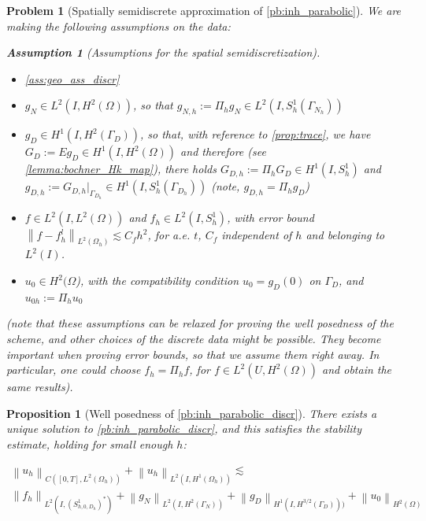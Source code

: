 \documentclass[english,a4paper,9pt,oneside]{scrbook}	%
\theoremstyle{break}
\newtheorem{prop}[equation]{Proposition}
\newtheorem{ass}[equation]{Assumption}
\newtheorem{pb}[equation]{Problem}
\theoremstyle{remark}
\newcommand{\norm}[1]{\left\lVert#1\right\rVert}
\begin{document}
\begin{appendices}
\begin{pb}[Spatially semidiscrete approximation of \cref{pb:inh_parabolic}]
We are making the following assumptions on the data:

\begin{ass}[Assumptions for the spatial semidiscretization]
\label{ass:discr_reg}
\textcolor{white}{ }
\begin{itemize}
	\item \cref{ass:geo_ass_discr}
	\item $g_N \in L^2(I,H^2(\Omega))$, so that $g_{N,h}:=\Pi_h g_N \in L^2(I, S^1_h(\Gamma_{N_h}))$
	\item $g_D \in H^1(I, H^{2}(\Gamma_D))$, so that, with reference to \cref{prop:trace}, we have $G_D:=Eg_D \in H^1(I,H^2(\Omega))$ and therefore (see \cref{lemma:bochner_Hk_map}), there holds	 $G_{D,h}:=\Pi_h G_D \in H^1(I, S^1_h)$ and $g_{D,h}:=G_{D,h}|_{\Gamma_{D_h}} \in H^1(I, S^1_h(\Gamma_{D_h}))$ (note, $g_{D,h} = \Pi_h g_D$)
	\item $f \in L^2(I,L^2(\Omega))$ and $f_h \in L^2(I, S^1_h)$, with error bound  $\norm{f-f_h^l}_{L^2(\Omega_h)}\lesssim C_f h^2$, for a.e. $t$, $C_f$ independent of $h$ and belonging to $L^2(I)$.
	\item $u_0\in H^2(\Omega$), with the compatibility condition $u_{0} = g_{D}(0)$ on $\Gamma_{D}$, and $u_{0h}:=\Pi_h u_0$
\end{itemize}

(note that these assumptions can be relaxed for proving the well posedness of the scheme, and other choices of the discrete data might be possible. They become important when proving error bounds, so that we assume them right away. In particular, one could choose $f_h=\Pi_h f$, for $f\in L^2(U, H^2(\Omega))$ and obtain the same results).

\end{ass}

\end{pb}

\begin{prop}[Well posedness of \cref{pb:inh_parabolic_discr}]
\label{prop:wp_discr_par}
There exists a unique solution to \cref{pb:inh_parabolic_discr}, and this satisfies the stability estimate, holding for small enough $h$:

\begin{align*}
	\norm{u_h}_{C([0,T],L^2(\Omega_h))} + \norm{u_h}_{L^2(I,H^1(\Omega_h))}\lesssim \\\norm{f_h}_{L^2(I,(S^1_{h,0,D_h})^*)}  + \norm{g_{N}}_{L^2(I,H^2(\Gamma_{N}))} + \norm{g_D}_{H^1(I,H^{3/2}(\Gamma_D)))} + \norm{u_{0}}_{H^2(\Omega)}
\end{align*}


\end{prop}
\end{appendices}
\end{document}

